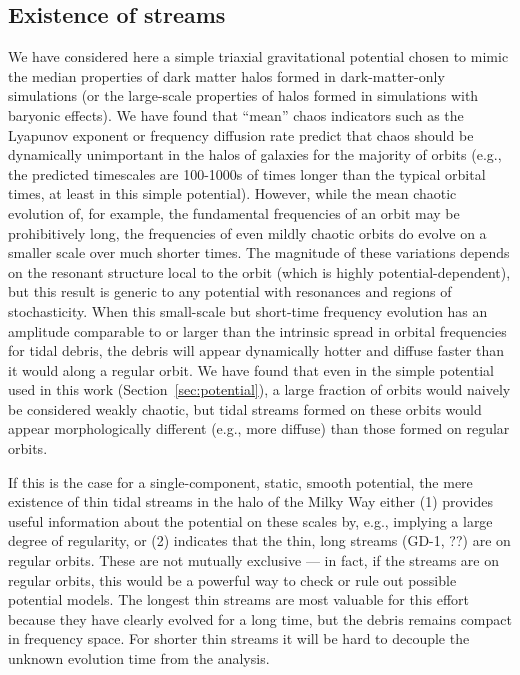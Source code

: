 \documentclass[letterpaper,12pt,preprint]{aastex}
\begin{document}
\subsection{Existence of streams}

We have considered here a simple triaxial gravitational potential chosen to mimic the median properties of dark matter halos formed in dark-matter-only simulations (or the large-scale properties of halos formed in simulations with baryonic effects). We have found that ``mean'' chaos indicators such as the Lyapunov exponent or frequency diffusion rate predict that chaos should be dynamically unimportant in the halos of galaxies for the majority of orbits (e.g., the predicted timescales are 100-1000s of times longer than the typical orbital times, at least in this simple potential). However, while the mean chaotic evolution of, for example, the fundamental frequencies of an orbit may be prohibitively long, the frequencies of even mildly chaotic orbits do evolve on a smaller scale over much shorter times. The magnitude of these variations depends on the resonant structure local to the orbit (which is highly potential-dependent), but this result is generic to any potential with resonances and regions of stochasticity. When this small-scale but short-time frequency evolution has an amplitude comparable to or larger than the intrinsic spread in orbital frequencies for tidal debris, the debris will appear dynamically hotter and diffuse faster than it would along a regular orbit. We have found that even in the simple potential used in this work (Section~\ref{sec:potential}), a large fraction of orbits would naively be considered weakly chaotic, but tidal streams formed on these orbits would appear morphologically different (e.g., more diffuse) than those formed on regular orbits. 

If this is the case for a single-component, static, smooth potential, the mere existence of thin tidal streams in the halo of the Milky Way either (1) provides useful information about the potential on these scales by, e.g., implying a large degree of regularity, or (2) indicates that the thin, long streams (GD-1, ??) are on regular orbits. These are not mutually exclusive --- in fact, if the streams are on regular orbits, this would be a powerful way to check or rule out possible potential models. The longest thin streams are most valuable for this effort because they have clearly evolved for a long time, but the debris remains compact in frequency space. For shorter thin streams it will be hard to decouple the unknown evolution time from the analysis.
\end{document}
